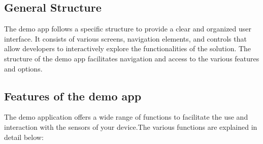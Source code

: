 \documentclass[12pt]{article}
\begin{document}
\subsection{General Structure}
    The demo app follows a specific structure to provide a clear and organized user interface. It consists of various screens, navigation elements, and controls that allow developers to interactively explore the functionalities of the solution. The structure of the demo app facilitates navigation and access to the various features and options.

\subsection{Features of the demo app}
    The demo application offers a wide range of functions to facilitate the use and interaction with the sensors of your device.The various functions are explained in detail below: 
\end{document}
